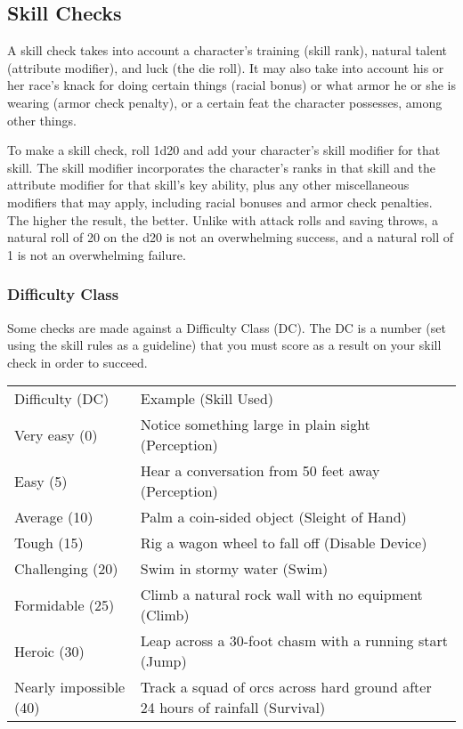 \subsection{Skill Checks}
A skill check takes into account a character's training (skill rank), natural talent (attribute modifier), and luck (the die roll). It may also take into account his or her race's knack for doing certain things (racial bonus) or what armor he or she is wearing (armor check penalty), or a certain feat the character possesses, among other things.

To make a skill check, roll 1d20 and add your character's skill modifier for that skill. The skill modifier incorporates the character's ranks in that skill and the attribute modifier for that skill's key ability, plus any other miscellaneous modifiers that may apply, including racial bonuses and armor check penalties. The higher the result, the better. Unlike with attack rolls and saving throws, a natural roll of 20 on the d20 is not an overwhelming success, and a natural roll of 1 is not an overwhelming failure.

\subsubsection{Difficulty Class}
Some checks are made against a Difficulty Class (DC). The DC is a number (set using the skill rules as a guideline) that you must score as a result on your skill check in order to succeed.

\begin{dtable}
\begin{tabularx}{\columnwidth}{p{8em} X}
Difficulty (DC) & Example (Skill Used) \\
Very easy (0) & Notice something large in plain sight (Perception) \\
Easy (5) & Hear a conversation from 50 feet away (Perception) \\
Average (10) & Palm a coin-sided object (Sleight of Hand) \\
Tough (15) & Rig a wagon wheel to fall off (Disable Device) \\
Challenging (20) & Swim in stormy water (Swim) \\
Formidable (25) & Climb a natural rock wall with no equipment (Climb) \\
Heroic (30) & Leap across a 30-foot chasm with a running start (Jump) \\
Nearly impossible (40) & Track a squad of orcs across hard ground after 24 hours of rainfall (Survival) \\
\end{tabularx}
\end{dtable}

